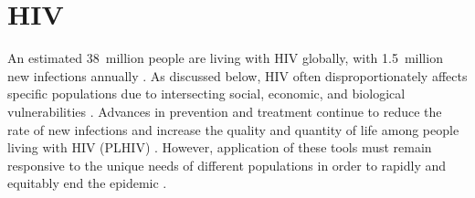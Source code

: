 \section{HIV}\label{intro.hiv}
An estimated 38~million people are living with HIV globally,
with 1.5~million new infections annually \cite{AIDSinfo}.
As discussed below, HIV often disproportionately affects specific populations
due to intersecting social, economic, and biological vulnerabilities \cite{WHO2016kp,Jin2021}.
Advances in prevention and treatment continue to reduce the rate of new infections and
increase the quality and quantity of life among people living with HIV (PLHIV) \cite{Eisinger2019tk}.
However, application of these tools must remain responsive to
the unique needs of different populations
in order to rapidly and equitably end the epidemic \cite{Eisinger2019tk}.
\pagebreak %
